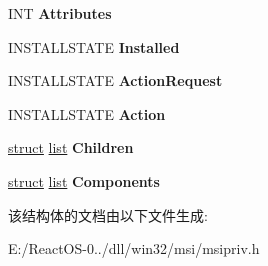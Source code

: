 \begin{DoxyCompactItemize}
\mbox{\label{structtag_m_s_i_f_e_a_t_u_r_e_a03faf05b8b9daed06ece08929fc137e9}} 
I\+NT {\bfseries Attributes}
\item 
\mbox{\label{structtag_m_s_i_f_e_a_t_u_r_e_a8df26dbe952c83c90c17b75c50af1358}} 
I\+N\+S\+T\+A\+L\+L\+S\+T\+A\+TE {\bfseries Installed}
\item 
\mbox{\label{structtag_m_s_i_f_e_a_t_u_r_e_ad7990f90737b9ca08992f605301bfdb8}} 
I\+N\+S\+T\+A\+L\+L\+S\+T\+A\+TE {\bfseries Action\+Request}
\item 
\mbox{\label{structtag_m_s_i_f_e_a_t_u_r_e_a4ecc93e303128a99be5c1add3af874fa}} 
I\+N\+S\+T\+A\+L\+L\+S\+T\+A\+TE {\bfseries Action}
\item 
\mbox{\label{structtag_m_s_i_f_e_a_t_u_r_e_ac9e92e6861b3302f01ffdb6f120dc8f3}} 
\hyperlink{interfacestruct}{struct} \hyperlink{classlist}{list} {\bfseries Children}
\item 
\mbox{\label{structtag_m_s_i_f_e_a_t_u_r_e_ae61e11a04a8fdc62c6f7e24a83a21a68}} 
\hyperlink{interfacestruct}{struct} \hyperlink{classlist}{list} {\bfseries Components}
\end{DoxyCompactItemize}


该结构体的文档由以下文件生成\+:\begin{DoxyCompactItemize}
\item 
E\+:/\+React\+O\+S-\/0../dll/win32/msi/msipriv.\+h\end{DoxyCompactItemize}
